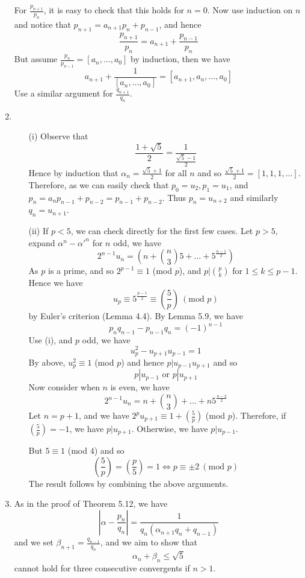 \begin{enumerate}
      For $\frac{p_{n+1}}{p_n}$, it is easy to check that this holds for $n=0$. Now use induction on $n$ and notice that $p_{n+1}=a_{n+1}p_n+p_{n-1}$, and hence
      $$\frac{p_{n+1}}{p_n}=a_{n+1}+\frac{p_{n-1}}{p_n}$$
      But assume $\frac{p_n}{p_{n-1}}=[a_n,\ldots,a_0]$ by induction, then we have
      $$a_{n+1}+\frac{1}{[a_n,\ldots,a_0]}=[a_{n+1},a_n,\ldots,a_0]$$
      Use a similar argument for $\frac{q_{n+1}}{q_n}$.
\item \begin{enumerate}
      \item[(i)] Observe that $$\frac{1+\sqrt{5}}{2}=\frac{1}{\frac{\sqrt{5}-1}{2}}$$
      Hence by induction that $\alpha_n=\frac{\sqrt{5}+1}{2}$ for all $n$ and so
      $\frac{\sqrt{5}+1}{2}=[1,1,1,\ldots]$. Therefore, as we can easily check that
      $p_0=u_2,p_1=u_1$, and $p_n=a_n p_{n-1}+p_{n-2}=p_{n-1}+p_{n-2}$. Thus
      $p_n=u_{n+2}$ and similarly $q_n=u_{n+1}$.\\
      \item[(ii)] If $p<5$, we can check directly for the first few cases. Let $p>5$, expand
      $\alpha^n-\alpha'^n$ for $n$ odd, we have
      $$2^{n-1}u_n=\left(n+\binom{n}{3}5+\ldots+5^{\frac{n-1}{2}}\right)$$
      As $p$ is a prime, and so $2^{p-1} \equiv 1$ (mod $p$), and
      $p|\binom {p}{k}$ for $1 \le k \le p-1$. Hence we have
      $$u_p \equiv 5^{\frac{p-1}{2}} \equiv \left(\frac{5}{p}\right) ~(\text{mod } p)$$
      by Euler's criterion (Lemma 4.4). By Lemma 5.9, we have
      $$p_n q_{n-1}-p_{n-1}q_n=(-1)^{n-1}$$
      Use (i), and $p$ odd, we have
      $$u^2_p-u_{p+1}u_{p-1}=1$$
      By above, $u^2_p \equiv 1$ (mod $p$) and hence $p|u_{p-1}u_{p+1}$ and so
      $$p|u_{p-1} \text{ or } p|u_{p+1}$$
      Now consider when $n$ is even, we have
      $$2^{n-1}u_n=n+\binom{n}{3}+\ldots+n 5^{\frac{n-2}{2}}$$
      Let $n=p+1$, and we have $2^p u_{p+1} \equiv 1+ (\frac{5}{p})$ (mod $p$).
      Therefore, if $(\frac{5}{p})=-1$, we have $p|u_{p+1}$. Otherwise, we have
      $p|u_{p-1}$.

      But $5 \equiv 1$ (mod $4$) and so
      $$\left(\frac{5}{p}\right)=\left(\frac{p}{5}\right)=1 \iff p \equiv \pm 2~(\text{mod }p)$$
      The result follows by combining the above arguments.
      \end{enumerate}
\item As in the proof of Theorem 5.12, we have
      $$\left|\alpha-\frac{p_n}{q_n}\right|=\frac{1}{q_n (\alpha_{n+1}q_n+q_{n-1})}$$
      and we set $\beta_{n+1}=\frac{q_{n-1}}{q_n}$, and we aim to show that
      $$\alpha_n+\beta_n \le \sqrt{5}$$ cannot hold for three consecutive convergents if $n>1$.


\end{enumerate}
